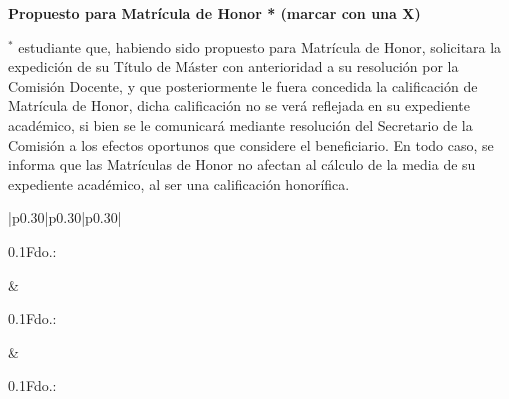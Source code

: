 \documentclass[11pt,a4paper,oneside]{article}
\begin{document}
\vspace{0.25cm}

\noindent\textbf{Propuesto para Matrícula de Honor * (marcar con una X)}
\hfill \MHProposalBoxes{}

\vspace{0.45cm}

\noindent$^{*}$ \expandafter\makefirstuc\expandafter{\wordAutorElOrLa} estudiante que, habiendo sido propuesto para Matrícula de Honor, solicitara la expedición de su Título de Máster con anterioridad a su resolución por la Comisión Docente, y que posteriormente le fuera concedida la calificación de Matrícula de Honor, dicha calificación no se verá reflejada en su expediente académico, si bien se le comunicará mediante resolución del Secretario de la Comisión a los efectos oportunos que considere el beneficiario. En todo caso, se informa que las Matrículas de Honor no afectan al cálculo de la media de su expediente académico, al ser una calificación honorífica.

\vfill

\begin{table}[ht]
  \centering
  \begin{tabular}{|p{0.30\textwidth}|p{0.30\textwidth}|p{0.30\textwidth}|}
    \hline
    \begin{minipage}[t][3.3cm][t]{\linewidth}
      \textbf{\wordPresidenteOrPresidenta}

      \vfill
      {\small \begin{spacing}{0.1}Fdo.: \myTribunalPresident\end{spacing}}
    \end{minipage}
    &
    \begin{minipage}[t][3.3cm][t]{\linewidth}
      \textbf{\wordVocalPrimeroOrPrimera{} \wordNumberVocalPrimeroOrPrimera}

      \vfill
      {\small \begin{spacing}{0.1}Fdo.: \myTribunalFirstSpokesperson\end{spacing}}
    \end{minipage}
    &
    \begin{minipage}[t][3.3cm][t]{\linewidth}
      \textbf{\wordVocalSegundoOrSegunda{} \wordNumberVocalSegundoOrSegunda}

      \vfill
      {\small \begin{spacing}{0.1}Fdo.: \myTribunalSecondSpokesperson\end{spacing}}
    \end{minipage}
    \\
    \hline
  \end{tabular}
\end{table}
\end{document}
